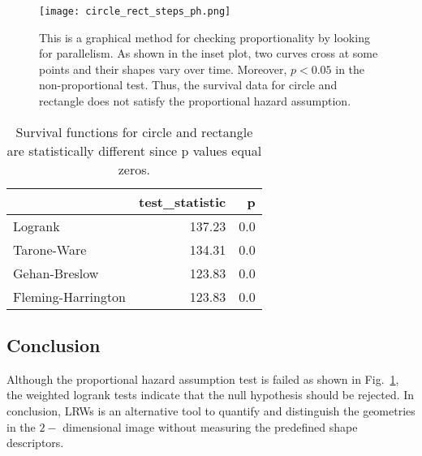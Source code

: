    \begin{figure}
     \centering
     \texttt{[image: circle\_rect\_steps\_ph.png]}
     \label{fig:ph_test_simple_shapes}
     \caption{This is a graphical method for checking proportionality by looking for parallelism. As shown in the inset plot, two curves cross at some points and their shapes vary over time. Moreover, $p < 0.05$ in the non-proportional test. Thus, the survival data for circle and rectangle does not satisfy the proportional hazard assumption.}
   \end{figure}


   \begin{table}
     \centering
     \begin{tabular}{lrr}
        \toprule
         {} &  test\_statistic &             p \\
         \midrule
         Logrank & 137.23 & 0.0 \\
         \midrule
         Tarone-Ware & 134.31 & 0.0 \\
         \midrule
         Gehan-Breslow & 123.83 & 0.0 \\
         \midrule
         Fleming-Harrington & 123.83 & 0.0 \\
         \bottomrule
     \end{tabular}
     \caption{Survival functions for circle and rectangle are statistically different since p values equal zeros.}
     \label{tab:test_simple_shape_steps}
   \end{table}



\subsection{Conclusion}


Although the proportional hazard assumption test is failed as shown in
Fig.~\ref{fig:ph_test_simple_shapes}, the weighted logrank tests
indicate that the null hypothesis should be rejected. In conclusion,
LRWs is an alternative tool to quantify and distinguish the geometries
in the $2-$ dimensional image without measuring the predefined shape
descriptors.
  

